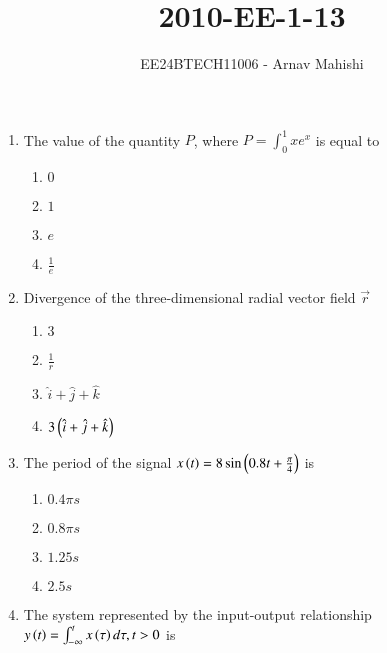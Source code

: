 \documentclass[journal]{IEEEtran}
\begin{document}

\vspace{3cm}

\title{2010-EE-1-13}
\author{EE24BTECH11006 - Arnav Mahishi}
{\let\newpage\relax\maketitle}
\begin{enumerate}
\item{
The value of the quantity $P$, where $P=\int_0^1xe^x$ is equal to
\begin{multicols}{4}
\begin{enumerate}
\item $0$
\item $1$
\item $e$ 
\item $\frac{1}{e}$
\end{enumerate}
\end{multicols}
}
\item{
Divergence of the three-dimensional radial vector field $\overrightarrow{r}$
\begin{multicols}{4}
\begin{enumerate}
\item $3$
\item $\frac{1}{r}$
\item $\hat{i}+\hat{j}+\hat{k}$
\item $3\left(\hat{i}+\hat{j}+\hat{k}\right)$
\end{enumerate}
\end{multicols}}
\item{
The period of the signal $x\left(t\right)=8\sin\left(0.8t+\frac{\pi}{4}\right)$ is
\begin{multicols}{4}
\begin{enumerate}
\item $0.4\pi s$
\item $0.8\pi s$
\item $1.25s$
\item $2.5s$
\end{enumerate}
\end{multicols}
}
\item{
The system represented by the input-output relationship $y\left(t\right)=\int_{-\infty}^t x\left(\tau\right)d\tau,t>0$ is
\begin{multicols}{2}
\begin{enumerate}

\end{enumerate}
\end{multicols}}
\end{enumerate}
\end{document}

